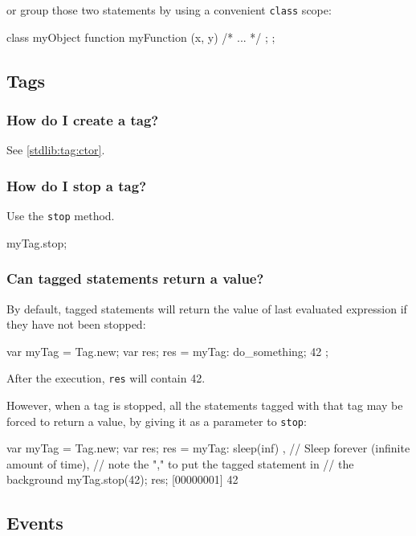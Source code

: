 \noindent
or group those two statements by using a convenient \lstinline{class}
scope:

\begin{urbiunchecked}
class myObject
{
  function myFunction (x, y) { /* ... */ };
};
\end{urbiunchecked}


\subsection{Tags}
\subsubsection{How do I create a tag?}
See \autoref{stdlib:tag:ctor}.

\subsubsection{How do I stop a tag?}

Use the \lstinline|stop| method.
\begin{urbiunchecked}
myTag.stop;
\end{urbiunchecked}

\subsubsection{Can tagged statements return a value?}
By default, tagged statements will return the value of last evaluated
expression if they have not been stopped:

\begin{urbiunchecked}
var myTag = Tag.new;
var res;
res = { myTag: { do_something; 42 } };
\end{urbiunchecked}

After the execution, \lstinline{res} will contain 42.

However, when a tag is stopped, all the statements tagged with that
tag may be forced to return a value, by giving it as a parameter to
\lstinline{stop}:

\begin{urbiunchecked}
var myTag = Tag.new;
var res;
{ res = { myTag: sleep(inf) } }, // Sleep forever (infinite amount of time),
                                 // note the "," to put the tagged statement in
                                 // the background
myTag.stop(42);
res;
[00000001] 42
\end{urbiunchecked}

\subsection{Events}
